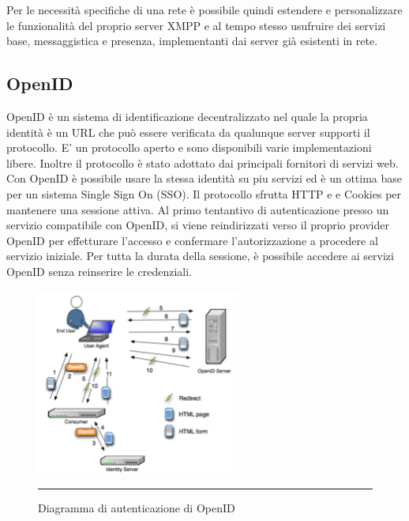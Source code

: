 Per le necessità specifiche di una rete è possibile quindi estendere e
personalizzare le funzionalità del proprio server XMPP e al tempo
stesso usufruire dei servizi base, messaggistica e presenza,
implementanti dai server già esistenti in rete.

\subsection{OpenID}
OpenID è un sistema di identificazione decentralizzato nel quale la
propria identità è un URL che può essere verificata da qualunque
server supporti il protocollo. E' un protocollo aperto e sono
disponibili varie implementazioni libere. Inoltre il protocollo è
stato adottato dai principali fornitori di servizi web. Con OpenID è
possibile usare la stessa identità su piu servizi ed è un ottima base
per un sistema Single Sign On (SSO). Il protocollo sfrutta HTTP e e
Cookies per mantenere una sessione attiva. Al primo tentantivo di
autenticazione presso un servizio compatibile con OpenID, si viene
reindirizzati verso il proprio provider OpenID per effetturare
l'accesso e confermare l'autorizzazione a procedere al servizio
iniziale. Per tutta la durata della sessione, è possibile accedere ai
servizi OpenID senza reinserire le credenziali.

\begin{figure}[htbp]
  \centering
  \includegraphics[width=0.6\textwidth]{./Figure/OpenID_Scenario.pdf}
  \rule{35em}{0.5pt}
  \caption[Diagramma di autenticazione di OpenID]{Diagramma di autenticazione di OpenID}
  \label{fig:OpenID}
\end{figure}



